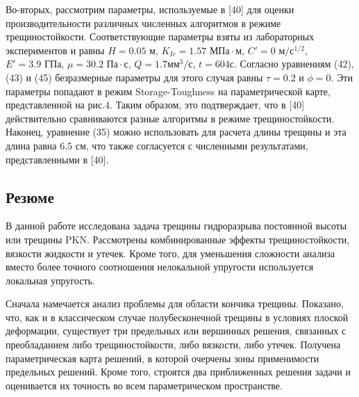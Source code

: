 \documentclass[main.tex]{subfiles}
\begin{document}
Во-вторых, рассмотрим параметры, используемые в [40] для оценки производительности различных численных алгоритмов в режиме трещиностойкости.
Соответствующие параметры взяты из лабораторных экспериментов и равны $H=0.05\text{ м}$, $K_{Ic}=1.57\text{ МПа}\cdot\text{м}$, $C'=0\text{ м}/\text{с}^{1/2}$, $E'=3.9\text{ ГПа}$, $\mu=30.2\text{ Па}\cdot\text{с}$, $Q=1.7\text{мм}^3/\text{с}$, $t=604\text{с}$.
Согласно уравнениям (42), (43) и (45) безразмерные параметры для этого случая равны $\tau=0.2$ и $\phi=0$.
Эти параметры попадают в режим Storage-Toughness на параметрической карте, представленной на рис.4.
Таким образом, это подтверждает, что в [40] действительно сравниваются разные алгоритмы в режиме трещиностойкости.
Наконец, уравнение (35) можно использовать для расчета длины трещины и эта длина равна $6.5\text{ см}$, что также согласуется с численными результатами, представленными в [40].

\subsection{Резюме}

В данной работе исследована задача трещины гидроразрыва постоянной высоты или трещины PKN.
Рассмотрены комбинированные эффекты трещиностойкости, вязкости жидкости и утечек.
Кроме того, для уменьшения сложности анализа вместо более точного соотношения нелокальной упругости используется локальная упругость.

Сначала намечается анализ проблемы для области кончика трещины.
Показано, что, как и в классическом случае полубесконечной трещины в условиях плоской деформации, существует три предельных или вершинных решения, связанных с преобладанием либо трещиностойкости, либо вязкости, либо утечек.
Получена параметрическая карта решений, в которой очерчены зоны применимости предельных решений.
Кроме того, строятся два приближенных решения задачи и оценивается их точность во всем параметрическом пространстве.
\end{document}
